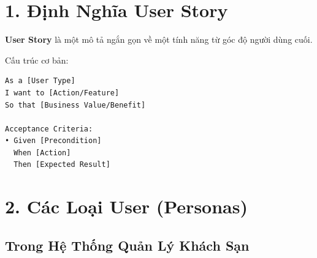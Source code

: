 \documentclass[12pt, a4paper]{report}
\begin{document}
\section{1. Định Nghĩa User Story}

\begin{tcolorbox}[colback=purple!5, colframe=purple!50]
\textbf{User Story} là một mô tả ngắn gọn về một tính năng từ góc độ người dùng cuối.

Cấu trúc cơ bản:
\begin{lstlisting}
As a [User Type]
I want to [Action/Feature]
So that [Business Value/Benefit]

Acceptance Criteria:
• Given [Precondition]
  When [Action]
  Then [Expected Result]
\end{lstlisting}
\end{tcolorbox}

\section{2. Các Loại User (Personas)}

\subsection{Trong Hệ Thống Quản Lý Khách Sạn}
\end{document}

